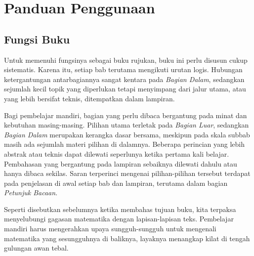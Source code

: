 
\section*{Panduan Penggunaan}
\hypertarget{o014.aljabr2.prelude.reader-guide}{ }

\subsection*{Fungsi Buku}

Untuk memenuhi fungsinya sebagai buku rujukan, buku ini perlu disusun cukup
sistematis. Karena itu, setiap bab terutama mengikuti
urutan logis. Hubungan ketergantungan antarbagiannya sangat kentara pada
\emph{Bagian Dalam}, sedangkan sejumlah kecil topik yang diperlukan tetapi
menyimpang dari jalur utama, atau yang lebih bersifat teknis, ditempatkan
dalam lampiran.

Bagi pembelajar mandiri, bagian yang perlu dibaca bergantung pada minat dan
kebutuhan masing-masing. Pilihan utama terletak pada \emph{Bagian Luar}, sedangkan
\emph{Bagian Dalam} merupakan kerangka dasar bersama, meskipun pada skala subbab
masih ada sejumlah materi pilihan di dalamnya. Beberapa perincian yang
lebih abstrak atau teknis dapat dilewati seperlunya ketika pertama kali
belajar. Pembahasan yang bergantung pada lampiran sebaiknya dilewati dahulu atau
hanya dibaca sekilas. Saran terperinci mengenai pilihan-pilihan tersebut
terdapat pada penjelasan di awal setiap bab dan lampiran, terutama dalam
bagian \emph{Petunjuk Bacaan}.

Seperti disebutkan sebelumnya ketika membahas tujuan buku, kita terpaksa
menyelubungi gagasan matematika dengan lapisan-lapisan teks.
Pembelajar mandiri harus mengerahkan upaya sungguh-sungguh untuk mengenali
matematika yang sesungguhnya di baliknya, layaknya menangkap kilat di
tengah gulungan awan tebal.

